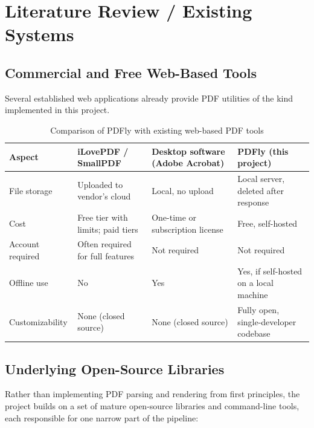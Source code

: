 \documentclass[12pt,a4paper]{report}
\begin{document}
\chapter{Literature Review / Existing Systems}

\section{Commercial and Free Web-Based Tools}
Several established web applications already provide PDF utilities of the kind implemented in
this project.

\begin{table}[h]
\centering
\caption{Comparison of PDFly with existing web-based PDF tools}
\label{tab:comparison}
\begin{tabular}{@{}p{2.6cm}p{3.4cm}p{3.4cm}p{3.4cm}@{}}
\toprule
\textbf{Aspect} & \textbf{iLovePDF / SmallPDF} & \textbf{Desktop software (Adobe Acrobat)} & \textbf{PDFly (this project)} \\
\midrule
File storage & Uploaded to vendor's cloud & Local, no upload & Local server, deleted after response \\
Cost & Free tier with limits; paid tiers & One-time or subscription license & Free, self-hosted \\
Account required & Often required for full features & Not required & Not required \\
Offline use & No & Yes & Yes, if self-hosted on a local machine \\
Customizability & None (closed source) & None (closed source) & Fully open, single-developer codebase \\
\bottomrule
\end{tabular}
\end{table}

\section{Underlying Open-Source Libraries}
Rather than implementing PDF parsing and rendering from first principles, the project builds on
a set of mature open-source libraries and command-line tools, each responsible for one narrow
part of the pipeline:
\end{document}
